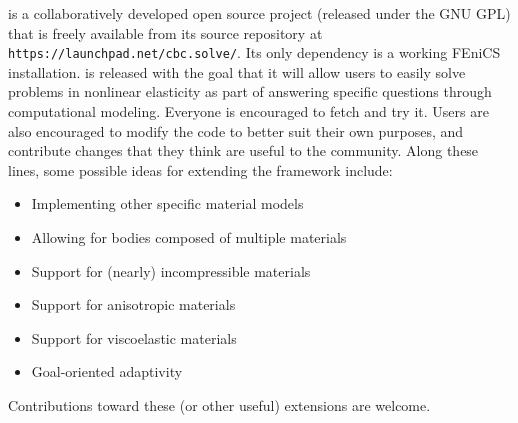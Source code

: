 \twist{} is a collaboratively developed open source project (released
under the GNU GPL) that is freely available from its source repository
at {\tt https://launchpad.net/cbc.solve/}. Its only dependency is a
working FEniCS installation. \twist{} is released with the goal that
it will allow users to easily solve problems in nonlinear elasticity
as part of answering specific questions through computational
modeling. Everyone is encouraged to fetch and try it. Users are also
encouraged to modify the code to better suit their own purposes, and
contribute changes that they think are useful to the community. Along
these lines, some possible ideas for extending the framework include:

\begin{itemize}
\item Implementing other specific material models
\item Allowing for bodies composed of multiple materials
\item Support for (nearly) incompressible materials
\item Support for anisotropic materials
\item Support for viscoelastic materials
\item Goal-oriented adaptivity
\end{itemize}

\noindent Contributions toward these (or other useful) extensions are
welcome.

